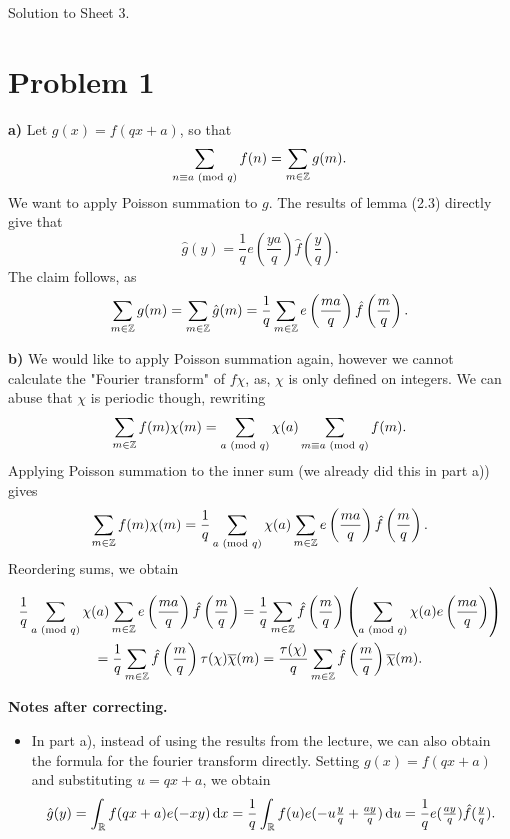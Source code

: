 \documentclass[a4paper,11pt]{article}
\begin{document}
\begin{center}
    \huge{ Solution to Sheet 3. }
\end{center}

\section*{Problem 1} %
\textbf{a)} Let $g(x) = f(qx + a)$, so that
\[
    \sum_{n \equiv a \text{ (mod $q$)}} f(n) = \sum_{m \in \mathbb{Z}} g(m).
\]
We want to apply Poisson summation to $g$. The results of lemma (2.3) directly
give that 
$$\hat g(y) = \frac 1q e\left( \frac{ya}q \right) \hat f\left(\frac yq \right).$$
The claim follows, as
$$ \sum_{m \in \mathbb{Z}} g(m) = \sum_{m \in \mathbb{Z}} \hat g(m) = \frac 1q \sum_{m \in \mathbb{Z}} 
    e\left( \frac{ma}q \right) \hat f\left(\frac mq \right).$$

\textbf{b)} We would like to apply Poisson summation again, however we cannot 
calculate the "Fourier transform" of $f\chi$, as, $\chi$ is only defined 
on integers. We can abuse that $\chi$ is periodic though, rewriting
\[
    \sum_{m \in \mathbb{Z}} f(m) \chi(m) = \sum_{a \text{ (mod $q$)}} \chi(a) \sum_{m \equiv a \text{ (mod $q$)}}
    f(m).
\]
Applying Poisson summation to the inner sum (we already did this in part
a)) gives
\[
    \sum_{m \in \mathbb{Z}} f(m) \chi(m) = \frac 1q \sum_{a \text{ (mod $q$)}} \chi(a) \sum_{m \in \mathbb{Z}} 
    e\left( \frac{ma}q \right) \hat f\left(\frac mq \right).
\]
Reordering sums, we obtain
\begin{multline*}
     \frac 1q \sum_{a \text{ (mod $q$)}} \chi(a) \sum_{m \in \mathbb{Z}} 
     e\left( \frac{ma}q \right) \hat f\left(\frac mq \right) = \frac 1q \sum_{m
         \in \mathbb{Z}} \hat f\left(\frac mq \right) \left( \sum_{a \text{ (mod $q$)}}
             \chi(a) e\left(\frac{ma}q \right) \right) \\ =  \frac 1q \sum_{m
         \in \mathbb{Z}} \hat f\left(\frac mq \right) \tau(\chi) \overline \chi(m) =
         \frac {\tau(\chi)}q \sum_{m \in \mathbb{Z}} \hat f\left(\frac mq \right)
         \overline \chi(m). 
\end{multline*}

\textbf{Notes after correcting.}
\begin{itemize}
    \item In part a), instead of using the results from the lecture, we can
        also obtain the formula for the fourier transform directly.
        Setting $g(x) = f(qx + a)$ and substituting $u = qx + a$, we obtain
        \[
            \hat g ( y ) = 
            \int_{\mathbb{R}} f(qx+a) e(-xy) \mathrm{\,d} x = 
            \frac 1q \int_{\mathbb{R}} f(u) e(-u\tfrac yq + \tfrac{ay}q)
            \mathrm{\,d} u = \frac 1q e(\tfrac {ay}q) \hat f(\tfrac yq).
        \]
\end{itemize}
\end{document}
